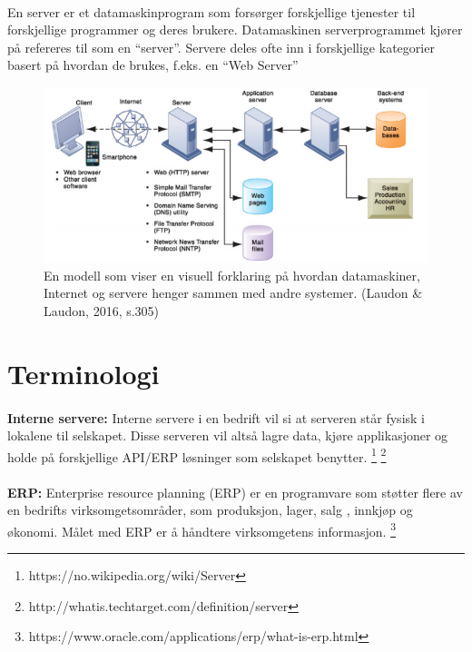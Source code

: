 \paragraph{} En server er et datamaskinprogram som forsørger forskjellige tjenester til forskjellige programmer og deres brukere. Datamaskinen serverprogrammet kjører på refereres til som en “server”. Servere deles ofte inn i forskjellige kategorier basert på hvordan de brukes, f.eks. en “Web Server”  
\begin{figure}[H]
\centering
\includegraphics[width=6.5in]{Bilder/cc2.PNG}
\caption{En modell som viser en visuell forklaring på hvordan datamaskiner, Internet og servere henger sammen med andre systemer. (Laudon \& Laudon, 2016, s.305) }
\end{figure}

\section{Terminologi}
\paragraph{} {\bfseries Interne servere:} Interne servere i en bedrift vil si at serveren står fysisk i lokalene til selskapet. Disse serveren vil altså lagre data, kjøre applikasjoner og holde på forskjellige API/ERP løsninger som selskapet benytter. \footnote{https://no.wikipedia.org/wiki/Server}
\footnote{http://whatis.techtarget.com/definition/server}

\paragraph{} {\bfseries ERP:} Enterprise resource planning (ERP) er en programvare som støtter flere av en bedrifts virksomgetsområder,  som produksjon, lager, salg , innkjøp og økonomi.  Målet med ERP er å håndtere virksomgetens informasjon.
\footnote{https://www.oracle.com/applications/erp/what-is-erp.html}

